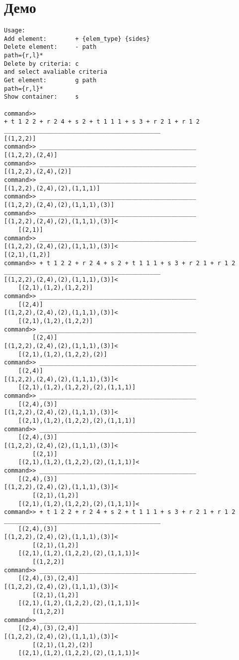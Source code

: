 \documentclass[12pt]{article}
\newcommand{\se}[1]{\section*{#1}}
\begin{document}
\se{Демо}
{\scriptsize
	\begin{lstlisting}
Usage:
Add element:        + {elem_type} {sides}
Delete element:     - path 
path={r,l}*
Delete by criteria: c
and select avaliable criteria
Get element:        g path
path={r,l}*
Show container:     s

command>> 
+ t 1 2 2 + r 2 4 + s 2 + t 1 1 1 + s 3 + r 2 1 + r 1 2
____________________________________________
[(1,2,2)]
command>> ____________________________________________
[(1,2,2),(2,4)]
command>> ____________________________________________
[(1,2,2),(2,4),(2)]
command>> ____________________________________________
[(1,2,2),(2,4),(2),(1,1,1)]
command>> ____________________________________________
[(1,2,2),(2,4),(2),(1,1,1),(3)]
command>> ____________________________________________
[(1,2,2),(2,4),(2),(1,1,1),(3)]<
    [(2,1)]
command>> ____________________________________________
[(1,2,2),(2,4),(2),(1,1,1),(3)]<
[(2,1),(1,2)]
command>> + t 1 2 2 + r 2 4 + s 2 + t 1 1 1 + s 3 + r 2 1 + r 1 2
____________________________________________
[(1,2,2),(2,4),(2),(1,1,1),(3)]<
    [(2,1),(1,2),(1,2,2)]
command>> ____________________________________________
    [(2,4)]
[(1,2,2),(2,4),(2),(1,1,1),(3)]<
    [(2,1),(1,2),(1,2,2)]
command>> ____________________________________________
        [(2,4)]
[(1,2,2),(2,4),(2),(1,1,1),(3)]<
    [(2,1),(1,2),(1,2,2),(2)]
command>> ____________________________________________
    [(2,4)]
[(1,2,2),(2,4),(2),(1,1,1),(3)]<
    [(2,1),(1,2),(1,2,2),(2),(1,1,1)]
command>> ____________________________________________
    [(2,4),(3)]
[(1,2,2),(2,4),(2),(1,1,1),(3)]<
    [(2,1),(1,2),(1,2,2),(2),(1,1,1)]
command>> ____________________________________________
    [(2,4),(3)]
[(1,2,2),(2,4),(2),(1,1,1),(3)]<
        [(2,1)]
    [(2,1),(1,2),(1,2,2),(2),(1,1,1)]<
command>> ____________________________________________
    [(2,4),(3)]
[(1,2,2),(2,4),(2),(1,1,1),(3)]<
        [(2,1),(1,2)]
    [(2,1),(1,2),(1,2,2),(2),(1,1,1)]<
command>> + t 1 2 2 + r 2 4 + s 2 + t 1 1 1 + s 3 + r 2 1 + r 1 2
____________________________________________
    [(2,4),(3)]
[(1,2,2),(2,4),(2),(1,1,1),(3)]<
        [(2,1),(1,2)]
    [(2,1),(1,2),(1,2,2),(2),(1,1,1)]<
        [(1,2,2)]
command>> ____________________________________________
    [(2,4),(3),(2,4)]
[(1,2,2),(2,4),(2),(1,1,1),(3)]<
        [(2,1),(1,2)]
    [(2,1),(1,2),(1,2,2),(2),(1,1,1)]<
        [(1,2,2)]
command>> ____________________________________________
    [(2,4),(3),(2,4)]
[(1,2,2),(2,4),(2),(1,1,1),(3)]<
        [(2,1),(1,2),(2)]
    [(2,1),(1,2),(1,2,2),(2),(1,1,1)]<

\end{lstlisting}}
\end{document}
